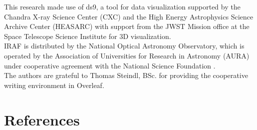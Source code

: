 \documentclass{article}
\begin{document}
This research made use of ds9, a tool for data visualization supported by the Chandra X-ray Science Center (CXC) and the High Energy Astrophysics Science Archive Center (HEASARC) with support from the JWST Mission office at the Space Telescope Science Institute for 3D visualization\parencite{2003ASPC..295..489J}.\\
IRAF is distributed by the National Optical Astronomy Observatory, which is operated by the Association of Universities for Research in Astronomy (AURA) under cooperative agreement with the National Science Foundation \parencite{1993ASPC...52..173T}. \\
The authors are grateful to Thomas Steindl, BSc. for providing the cooperative writing environment in Overleaf. %

\pagebreak
\section{References}
\printbibliography[heading=none] %

\pagebreak

\appendix
\end{document}
